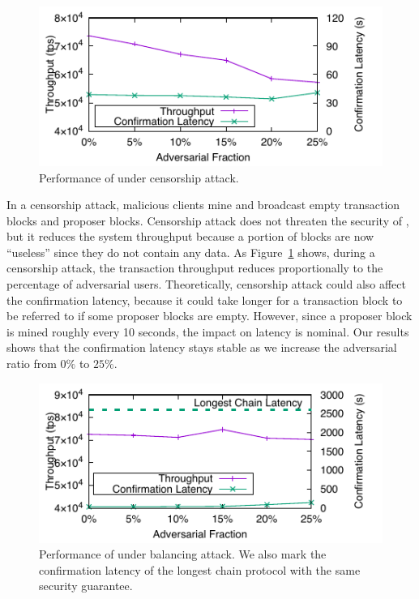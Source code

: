 \begin{figure}
    \centering
    \includegraphics{figures/attack-fig-censor.pdf}
    \caption{\small Performance of \prism under  censorship attack.}
    \label{fig:attack-censor}
    \vspace{-5mm}
\end{figure}

In a censorship attack, malicious clients mine and broadcast empty transaction blocks and proposer blocks. Censorship attack does not threaten the security of \prism, but it reduces the system throughput because a portion of blocks are now ``useless'' since they do not contain any data. As Figure~\ref{fig:attack-censor} shows, during a censorship attack, the transaction throughput reduces proportionally to the percentage of adversarial users. Theoretically, censorship attack could also affect the confirmation latency, because it could take longer for a transaction block to be referred to if some proposer blocks are empty. However, since a proposer block is mined roughly every 10 seconds, the impact on latency is nominal. Our results shows that the confirmation latency stays stable as we increase the adversarial ratio from $0\%$ to $25\%$.


\label{sec:balancing}

\begin{figure}
    \centering
    \includegraphics{figures/attack-fig-balancing.pdf}
    \vspace{-2mm}
    \caption{\small Performance of \prism under balancing attack. We also mark the confirmation latency of the longest chain protocol with the same security guarantee.}
    \label{fig:attack-balancing}
    \vspace{-4mm}
\end{figure}

